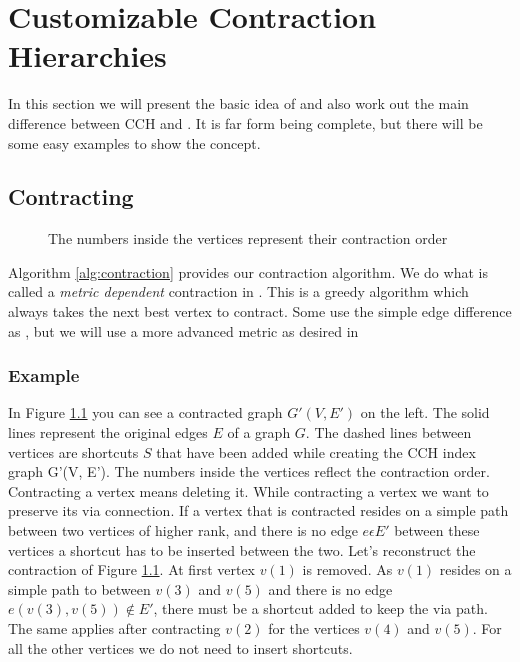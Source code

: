 \chapter{Customizable Contraction Hierarchies}\label{sec:Preliminary_CCH}

In this section we will present the basic idea of \cite[Customization Contraction Hierarchies]{CCH} and also work out the main difference between CCH and \cite[Contraction Hierarchies]{Geisberger_2012}.
It is far form being complete, but there will be some easy examples to show the concept. 

\section{Contracting}



\begin{figure}
    \centering
    
    \caption{The numbers inside the vertices represent their contraction order}
    \label{fig:contrating_and_searching}
\end{figure}

Algorithm \ref{alg:contraction} provides our contraction algorithm. We do what is called a \textit{metric dependent} contraction in \cite[Customization Contraction Hierarchies]{CCH}. 
This is a greedy algorithm which always takes the next best vertex to contract. Some use the simple edge difference as \cite[Contraction Hierarchies]{Geisberger_2012}, but we will use
a more advanced metric as desired in 

\subsection{Example}

In Figure \ref{fig:contrating_and_searching} you can see a contracted graph $G'(V,E')$ on the left. The solid lines represent the original edges $E$ of a graph $G$. The dashed lines between vertices are shortcuts $S$ that 
have been added while creating the CCH index graph G'(V, E'). The numbers inside the vertices reflect the contraction order.
\\
Contracting a vertex means deleting it. While contracting a vertex we want to preserve its via connection. If a vertex that is contracted resides on a simple path between two vertices of higher rank,
and there is no edge $e \epsilon E'$ between these vertices a shortcut has to be inserted between the two. 
Let's reconstruct the contraction of Figure \ref{fig:contrating_and_searching}. At first vertex $v(1)$ is removed. As $v(1)$ resides on a simple path to between $v(3)$ and $v(5)$ and there is no edge $e(v(3), v(5)) \notin E'$,
there must be a shortcut added to keep the via path.
The same applies after contracting $v(2)$ for the vertices $v(4)$ and $v(5)$. For all the other vertices we do not need to insert shortcuts.

